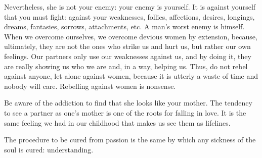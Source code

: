 
\par Nevertheless, she is not your enemy: your enemy is yourself. It is against yourself that you must fight: against your weaknesses, follies, affections, desires, longings, dreams, fantasies, sorrows, attachments, etc. A man's worst enemy is himself. When we overcome ourselves, we overcome devious women by extension, because, ultimately, they are not the ones who strike us and hurt us, but rather our own feelings. Our partners only use our weaknesses against us, and by doing it, they are really showing us who we are and, in a way, helping us. Thus, do not rebel against anyone, let alone against women, because it is utterly a waste of time and nobody will care. Rebelling against women is nonsense.

\par Be aware of the addiction to find that she looks like your mother. The tendency to see a partner as one's mother is one of the roots for falling in love. It is the same feeling we had in our childhood that makes us see them as lifelines.

\par The procedure to be cured from passion is the same by which any sickness of the soul is cured: understanding.